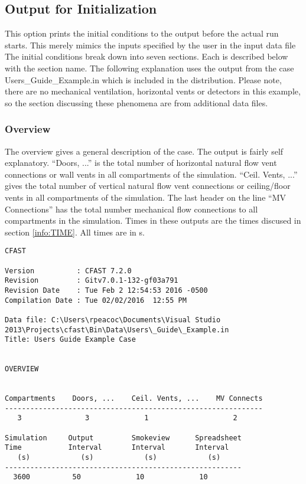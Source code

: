 \subsection{Output for Initialization}

This option prints the initial conditions to the output before the actual run starts.  This merely mimics the inputs specified by the user in the input data file  The initial conditions break down into seven sections.  Each is described below with the section name. The following explanation uses the output from the case {\ct Users\_Guide\_Example.in} which is included in the distribution. Please note, there are no mechanical ventilation, horizontal vents or detectors in this example, so the section discussing these phenomena are from additional data files.

\subsubsection{Overview}

The overview gives a general description of the case.  The output is fairly self explanatory. ``Doors, ...'' is the total number of horizontal natural flow vent connections or wall vents in all compartments of the simulation.  ``Ceil. Vents, ...'' gives the total number of vertical natural flow vent connections or ceiling/floor vents in all compartments of the simulation.  The last header on the line ``MV Connections'' has the total number mechanical flow connections to all compartments in the simulation. Times in these outputs are the times discused in section \ref{info:TIME}. All times are in s.
\begin{lstlisting}[basicstyle=\tiny]
CFAST

Version          : CFAST 7.2.0
Revision         : Gitv7.0.1-132-gf03a791
Revision Date    : Tue Feb 2 12:54:53 2016 -0500
Compilation Date : Tue 02/02/2016  12:55 PM

Data file: C:\Users\rpeacoc\Documents\Visual Studio 2013\Projects\cfast\Bin\Data\Users\_Guide\_Example.in
Title: Users Guide Example Case


OVERVIEW


Compartments    Doors, ...    Ceil. Vents, ...    MV Connects
-------------------------------------------------------------
   3               3             1                    2

Simulation     Output         Smokeview      Spreadsheet
Time           Interval       Interval       Interval
   (s)            (s)            (s)            (s)
--------------------------------------------------------
  3600          50             10             10
\end{lstlisting}

